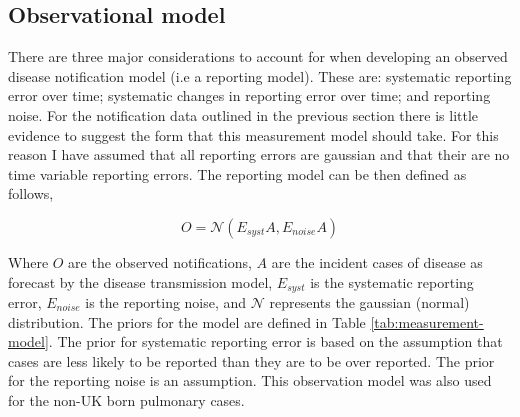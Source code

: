 \documentclass[11pt,twoside]{bristolthesis}
\begin{document}
  \hypertarget{observational-model}{%
  \subsection{Observational model}\label{observational-model}}
  
  There are three major considerations to account for when developing an observed disease notification model (i.e a reporting model). These are: systematic reporting error over time; systematic changes in reporting error over time; and reporting noise. For the notification data outlined in the previous section there is little evidence to suggest the form that this measurement model should take. For this reason I have assumed that all reporting errors are gaussian and that their are no time variable reporting errors. The reporting model can be then defined as follows,
  
  \[O = \mathcal{N}\left(E_{syst}A, E_{noise}A\right)\]
  
  Where \(O\) are the observed notifications, \(A\) are the incident cases of disease as forecast by the disease transmission model, \(E_{syst}\) is the systematic reporting error, \(E_{noise}\) is the reporting noise, and \(\mathcal{N}\) represents the gaussian (normal) distribution. The priors for the model are defined in Table \ref{tab:measurement-model}. The prior for systematic reporting error is based on the assumption that cases are less likely to be reported than they are to be over reported. The prior for the reporting noise is an assumption. This observation model was also used for the non-UK born pulmonary cases.
  
\end{document}
